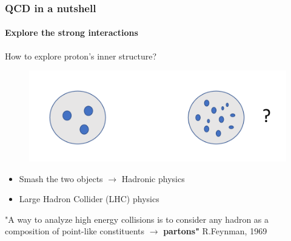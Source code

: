 \documentclass[aspectratio=43]{beamer}
\begin{document}
\begin{frame}
	
	\frametitle{QCD in a nutshell}
	\framesubtitle{Explore the strong interactions}
	
	\footnotesize 
	
	How to explore proton's inner structure?
	
	\begin{figure}
		\includegraphics[width = 0.5\linewidth]{plots/section1/protons.png}
	\end{figure}
	
	
	\begin{itemize}
	\item Smash the two objects $\longrightarrow$ Hadronic physics
	\item Large Hadron Collider (LHC) physics
	\end{itemize}
	
	{\color{blue}"A way to analyze high energy collisions is to consider any hadron as a \\ composition of point-like constituents $\longrightarrow$ \textbf{partons"} } R.Feynman, 1969 

\end{frame}
\end{document}
